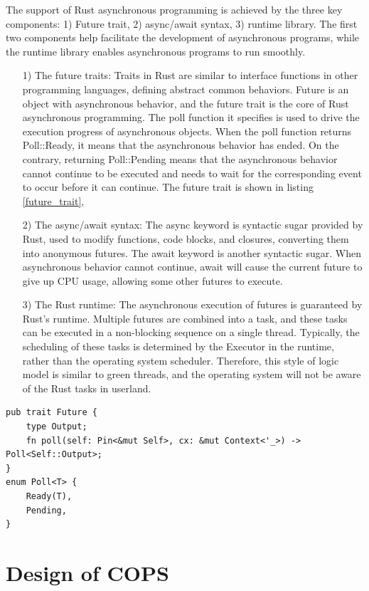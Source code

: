 \documentclass[sigconf,review,anonymous]{acmart}
\begin{document}
The support of Rust asynchronous programming is achieved by the three key components: 1) Future trait, 2) async/await syntax, 3) runtime library. The first two components help facilitate the development of asynchronous programs, while the runtime library enables asynchronous programs to run smoothly.

\begin{itemize}[leftmargin=*]
    \item[1)] The future traits: Traits in Rust are similar to interface functions in other programming languages, defining abstract common behaviors. Future is an object with asynchronous behavior, and the future trait is the core of Rust asynchronous programming. The poll function it specifies is used to drive the execution progress of asynchronous objects. When the poll function returns Poll::Ready, it means that the asynchronous behavior has ended. On the contrary, returning Poll::Pending means that the asynchronous behavior cannot continue to be executed and needs to wait for the corresponding event to occur before it can continue. The future trait is shown in listing \ref{future_trait},
    \item[2)] The async/await syntax: The async keyword is syntactic sugar provided by Rust, used to modify functions, code blocks, and closures, converting them into anonymous futures. The await keyword is another syntactic sugar. When asynchronous behavior cannot continue, await will cause the current future to give up CPU usage, allowing some other futures to execute.
    \item[3)] The Rust runtime: The asynchronous execution of futures is guaranteed by Rust’s runtime. Multiple futures are combined into a task, and these tasks can be executed in a non-blocking sequence on a single thread. Typically, the scheduling of these tasks is determined by the Executor in the runtime, rather than the operating system scheduler. Therefore, this style of logic model is similar to green threads, and the operating system will not be aware of the Rust tasks in userland.
\end{itemize}


\begin{lstlisting}[label={future_trait},caption={Future trait}]
pub trait Future {
    type Output;
    fn poll(self: Pin<&mut Self>, cx: &mut Context<'_>) -> Poll<Self::Output>;
}
enum Poll<T> {
    Ready(T),
    Pending,
}
\end{lstlisting}

\section{Design of COPS}
\end{document}
